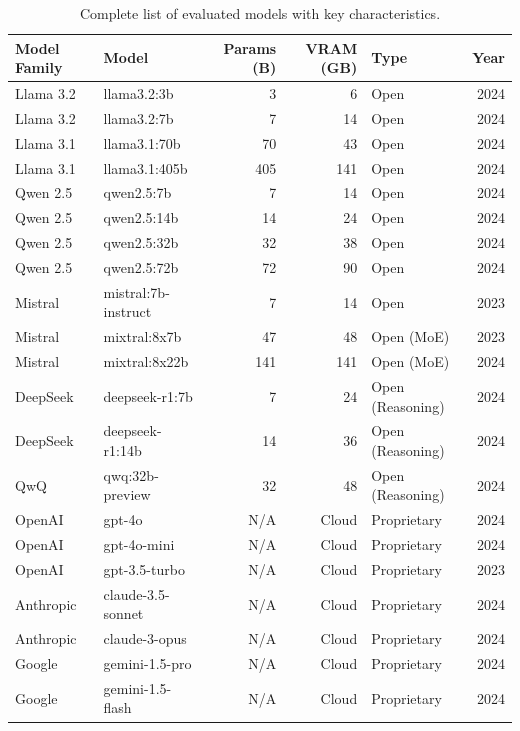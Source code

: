 \begin{table}[htbp]
    \centering
    \caption{Complete list of evaluated models with key characteristics.}
    \label{tab:complete_model_list}
    \small
    \begin{tabular}{llrrlr}
        \toprule
        \textbf{Model Family} & \textbf{Model} & \textbf{Params (B)} & \textbf{VRAM (GB)} & \textbf{Type} & \textbf{Year} \\
        \midrule
        Llama 3.2 & llama3.2:3b & 3 & 6 & Open & 2024 \\
        Llama 3.2 & llama3.2:7b & 7 & 14 & Open & 2024 \\
        Llama 3.1 & llama3.1:70b & 70 & 43 & Open & 2024 \\
        Llama 3.1 & llama3.1:405b & 405 & 141 & Open & 2024 \\
        \addlinespace
        Qwen 2.5 & qwen2.5:7b & 7 & 14 & Open & 2024 \\
        Qwen 2.5 & qwen2.5:14b & 14 & 24 & Open & 2024 \\
        Qwen 2.5 & qwen2.5:32b & 32 & 38 & Open & 2024 \\
        Qwen 2.5 & qwen2.5:72b & 72 & 90 & Open & 2024 \\
        \addlinespace
        Mistral & mistral:7b-instruct & 7 & 14 & Open & 2023 \\
        Mistral & mixtral:8x7b & 47 & 48 & Open (MoE) & 2023 \\
        Mistral & mixtral:8x22b & 141 & 141 & Open (MoE) & 2024 \\
        \addlinespace
        DeepSeek & deepseek-r1:7b & 7 & 24 & Open (Reasoning) & 2024 \\
        DeepSeek & deepseek-r1:14b & 14 & 36 & Open (Reasoning) & 2024 \\
        \addlinespace
        QwQ & qwq:32b-preview & 32 & 48 & Open (Reasoning) & 2024 \\
        \addlinespace
        OpenAI & gpt-4o & N/A & Cloud & Proprietary & 2024 \\
        OpenAI & gpt-4o-mini & N/A & Cloud & Proprietary & 2024 \\
        OpenAI & gpt-3.5-turbo & N/A & Cloud & Proprietary & 2023 \\
        \addlinespace
        Anthropic & claude-3.5-sonnet & N/A & Cloud & Proprietary & 2024 \\
        Anthropic & claude-3-opus & N/A & Cloud & Proprietary & 2024 \\
        \addlinespace
        Google & gemini-1.5-pro & N/A & Cloud & Proprietary & 2024 \\
        Google & gemini-1.5-flash & N/A & Cloud & Proprietary & 2024 \\
        \bottomrule
    \end{tabular}
\end{table}

